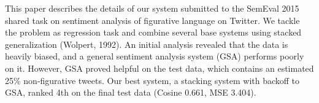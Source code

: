This paper describes the details of our system submitted to the SemEval 2015 shared task on sentiment analysis of figurative language on Twitter. We tackle the problem as regression task and combine several base systems using stacked generalization (Wolpert, 1992). An initial analysis revealed that the data is heavily biased, and a general sentiment analysis system (GSA) performs poorly on it. However, GSA proved helpful on the test data, which contains an estimated 25\% non-figurative tweets. Our best system, a stacking system with backoff to GSA, ranked 4th on the final test data (Cosine 0.661, MSE 3.404).
